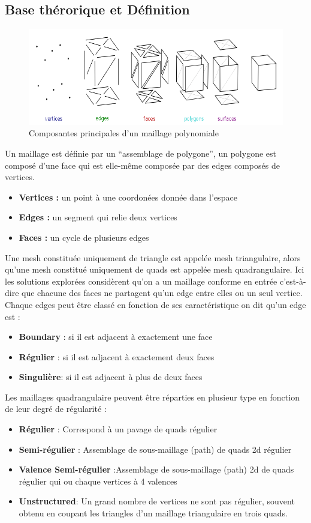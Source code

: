 \documentclass[runningheads]{llncs}
\begin{document}
\subsection{Base thérorique et Définition}
\begin{figure}
\includegraphics[width=\textwidth]{img/geom-def.png}
\caption{Composantes principales d'un maillage polynomiale} \label{fig1}
\end{figure}

Un maillage est définie par un “assemblage de polygone”, un polygone est composé d’une face qui est elle-même composée par des edges composés de vertices.
\begin{itemize}
  \item \textbf{Vertices :} un point à une coordonées donnée dans l’espace
  \item \textbf{Edges :} un segment qui relie deux vertices
  \item \textbf{Faces :} un cycle de plusieurs edges
\end{itemize}
Une mesh constituée uniquement de triangle est appelée mesh triangulaire, alors qu’une mesh constitué uniquement de quads est appelée mesh quadrangulaire. Ici les solutions explorées considèrent qu’on a un maillage conforme en entrée c'est-à-dire que chacune des faces ne partagent qu’un edge entre elles ou un seul vertice.
Chaque edges peut être classé en fonction de ses caractéristique on dit qu’un edge est :
\begin{itemize}
  \item \textbf{Boundary} : si il est adjacent à exactement une face
  \item \textbf{Régulier} : si il est adjacent à exactement deux faces
  \item  \textbf{Singulière}: si il est adjacent à plus de deux faces
\end{itemize}

Les maillages quadrangulaire peuvent être réparties en plusieur type en fonction de leur degré de régularité :
\begin{itemize}
  \item \textbf{Régulier} : Correspond à un pavage de quads régulier
  \item \textbf{Semi-régulier} : Assemblage de sous-maillage (path) de quads 2d régulier
  \item \textbf{Valence Semi-régulier} :Assemblage de sous-maillage (path) 2d de quads régulier qui ou chaque vertices à 4 valences
  \item  \textbf{Unstructured}: Un grand nombre de vertices ne sont pas régulier, souvent obtenu en coupant les triangles d’un maillage triangulaire en trois quads.

\end{itemize}
\end{document}
